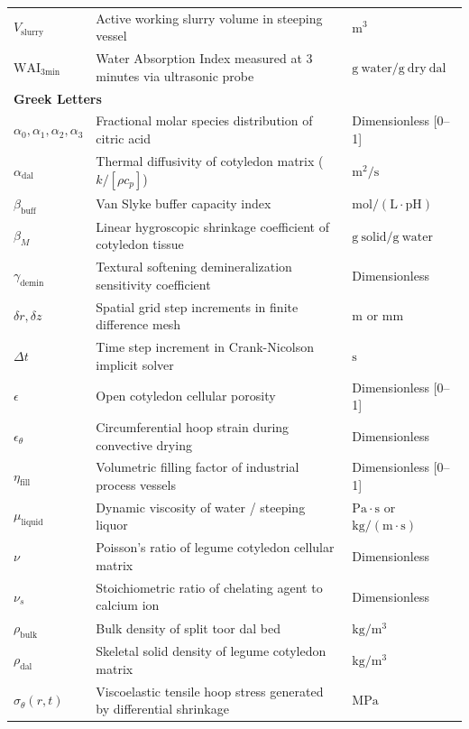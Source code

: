 \documentclass[10pt,a4paper]{article}
\begin{document}
\begin{longtable}{p{2.5cm}p{10.2cm}p{3.0cm}}
$V_{\mathrm{slurry}}$ & Active working slurry volume in steeping vessel & $\mathrm{m^3}$ \\
$\mathrm{WAI}_{\mathrm{3min}}$ & Water Absorption Index measured at 3 minutes via ultrasonic probe & $\mathrm{g\ water/g\ dry\ dal}$ \\
\midrule
\multicolumn{3}{l}{\textbf{Greek Letters}} \\
$\alpha_0, \alpha_1, \alpha_2, \alpha_3$ & Fractional molar species distribution of citric acid & Dimensionless [0--1] \\
$\alpha_{\mathrm{dal}}$ & Thermal diffusivity of cotyledon matrix ($k / [\rho c_p]$) & $\mathrm{m^2/s}$ \\
$\beta_{\mathrm{buff}}$ & Van Slyke buffer capacity index & $\mathrm{mol/(L \cdot pH)}$ \\
$\beta_M$ & Linear hygroscopic shrinkage coefficient of cotyledon tissue & $\mathrm{g\ solid/g\ water}$ \\
$\gamma_{\mathrm{demin}}$ & Textural softening demineralization sensitivity coefficient & Dimensionless \\
$\delta r, \delta z$ & Spatial grid step increments in finite difference mesh & $\mathrm{m}$ or $\mathrm{mm}$ \\
$\Delta t$ & Time step increment in Crank-Nicolson implicit solver & $\mathrm{s}$ \\
$\epsilon$ & Open cotyledon cellular porosity & Dimensionless [0--1] \\
$\epsilon_{\theta}$ & Circumferential hoop strain during convective drying & Dimensionless \\
$\eta_{\mathrm{fill}}$ & Volumetric filling factor of industrial process vessels & Dimensionless [0--1] \\
$\mu_{\mathrm{liquid}}$ & Dynamic viscosity of water / steeping liquor & $\mathrm{Pa \cdot s}$ or $\mathrm{kg/(m \cdot s)}$ \\
$\nu$ & Poisson's ratio of legume cotyledon cellular matrix & Dimensionless \\
$\nu_s$ & Stoichiometric ratio of chelating agent to calcium ion & Dimensionless \\
$\rho_{\mathrm{bulk}}$ & Bulk density of split toor dal bed & $\mathrm{kg/m^3}$ \\
$\rho_{\mathrm{dal}}$ & Skeletal solid density of legume cotyledon matrix & $\mathrm{kg/m^3}$ \\
$\sigma_{\theta}(r, t)$ & Viscoelastic tensile hoop stress generated by differential shrinkage & $\mathrm{MPa}$ \\

\end{longtable}
\end{document}
